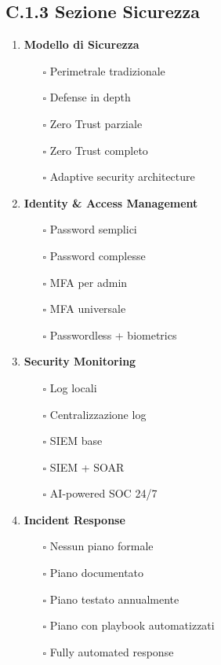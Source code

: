 \subsection{C.1.3 Sezione Sicurezza}

\begin{enumerate}
\item \textbf{Modello di Sicurezza}
   \begin{itemize}
   \item[$\square$] Perimetrale tradizionale
   \item[$\square$] Defense in depth
   \item[$\square$] Zero Trust parziale
   \item[$\square$] Zero Trust completo
   \item[$\square$] Adaptive security architecture
   \end{itemize}

\item \textbf{Identity \& Access Management}
   \begin{itemize}
   \item[$\square$] Password semplici
   \item[$\square$] Password complesse
   \item[$\square$] MFA per admin
   \item[$\square$] MFA universale
   \item[$\square$] Passwordless + biometrics
   \end{itemize}

\item \textbf{Security Monitoring}
   \begin{itemize}
   \item[$\square$] Log locali
   \item[$\square$] Centralizzazione log
   \item[$\square$] SIEM base
   \item[$\square$] SIEM + SOAR
   \item[$\square$] AI-powered SOC 24/7
   \end{itemize}

\item \textbf{Incident Response}
   \begin{itemize}
   \item[$\square$] Nessun piano formale
   \item[$\square$] Piano documentato
   \item[$\square$] Piano testato annualmente
   \item[$\square$] Piano con playbook automatizzati
   \item[$\square$] Fully automated response
   \end{itemize}
\end{enumerate}

